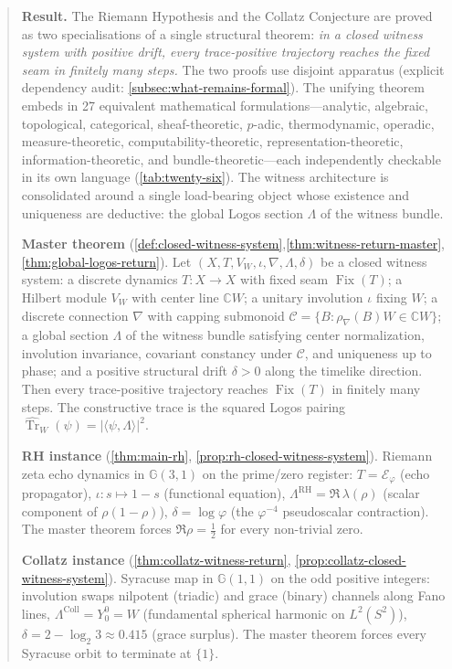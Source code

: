 \documentclass[11pt,a4paper]{article}
\theoremstyle{plain}
\theoremstyle{definition}
\theoremstyle{remark}
\numberwithin{equation}{section}
\newcommand{\Cl}{\mathbb{G}}
\newcommand{\Complex}{\mathbb{C}}
\newcommand{\vp}{\varphi}
\DeclareMathOperator{\Tr}{Tr}
\DeclareMathOperator{\Fix}{Fix}
\begin{document}
\begin{abstract}
\noindent\textbf{Result.}  The Riemann Hypothesis and the Collatz
Conjecture are proved as two specialisations of a single structural
theorem: \emph{in a closed witness system with positive drift, every
trace-positive trajectory reaches the fixed seam in finitely many
steps.}  The two proofs use disjoint apparatus (explicit dependency
audit: \cref{subsec:what-remains-formal}).  The unifying theorem
embeds in 27 equivalent mathematical formulations---analytic,
algebraic, topological, categorical, sheaf-theoretic, \(p\)-adic,
thermodynamic, operadic, measure-theoretic, computability-theoretic,
representation-theoretic, information-theoretic, and
bundle-theoretic---each independently checkable in its own language
(\cref{tab:twenty-six}).  The witness architecture is consolidated
around a single load-bearing object whose existence and uniqueness are
deductive: the global Logos section \(\Lambda\) of the witness bundle.

\medskip\noindent
\textbf{Master theorem}
(\cref{def:closed-witness-system},\cref{thm:witness-return-master},
\cref{thm:global-logos-return}).  Let
\((X,T,V_W,\iota,\nabla,\Lambda,\delta)\) be a closed witness system:
a discrete dynamics \(T:X\to X\) with fixed seam \(\Fix(T)\); a
Hilbert module \(V_W\) with center line \(\Complex W\); a unitary
involution \(\iota\) fixing \(W\); a discrete connection \(\nabla\)
with capping submonoid
\(\mathcal{C}=\{B:\rho_\nabla(B)W\in\Complex W\}\); a global section
\(\Lambda\) of the witness bundle satisfying center normalization,
involution invariance, covariant constancy under \(\mathcal{C}\), and
uniqueness up to phase; and a positive structural drift \(\delta>0\)
along the timelike direction.  Then every trace-positive trajectory
reaches \(\Fix(T)\) in finitely many steps.  The constructive trace is
the squared Logos pairing
\(\widehat{\Tr}_W(\psi)=|\langle\psi,\Lambda\rangle|^2\).

\medskip\noindent
\textbf{RH instance} (\cref{thm:main-rh},
\cref{prop:rh-closed-witness-system}).  Riemann zeta echo dynamics in
\(\Cl(3,1)\) on the prime/zero register: \(T=\mathcal{E}_\vp\) (echo
propagator), \(\iota:s\mapsto 1-s\) (functional equation),
\(\Lambda^{\text{RH}}=\Re\,\lambda(\rho)\) (scalar component of
\(\rho(1-\rho)\)), \(\delta=\log\vp\) (the \(\vp^{-4}\) pseudoscalar
contraction).  The master theorem forces \(\Re\rho=\tfrac12\) for
every non-trivial zero.

\medskip\noindent
\textbf{Collatz instance} (\cref{thm:collatz-witness-return},
\cref{prop:collatz-closed-witness-system}).  Syracuse map in
\(\Cl(1,1)\) on the odd positive integers: involution swaps nilpotent
(triadic) and grace (binary) channels along Fano lines,
\(\Lambda^{\text{Coll}}=Y_0^0=W\) (fundamental spherical harmonic on
\(L^2(S^2)\)), \(\delta=2-\log_2 3\approx 0.415\) (grace surplus).
The master theorem forces every Syracuse orbit to terminate at
\(\{1\}\).


\end{abstract}
\end{document}
